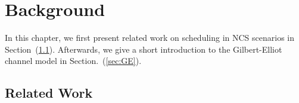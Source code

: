 \chapter{Background}


In this chapter, we first present related work on scheduling in NCS scenarios in
Section~(\ref{sec:survey}). Afterwards, we give a short introduction to the
Gilbert-Elliot channel model in Section.~(\ref{sec:GE}). 

\section{Related Work} \label{sec:survey}

